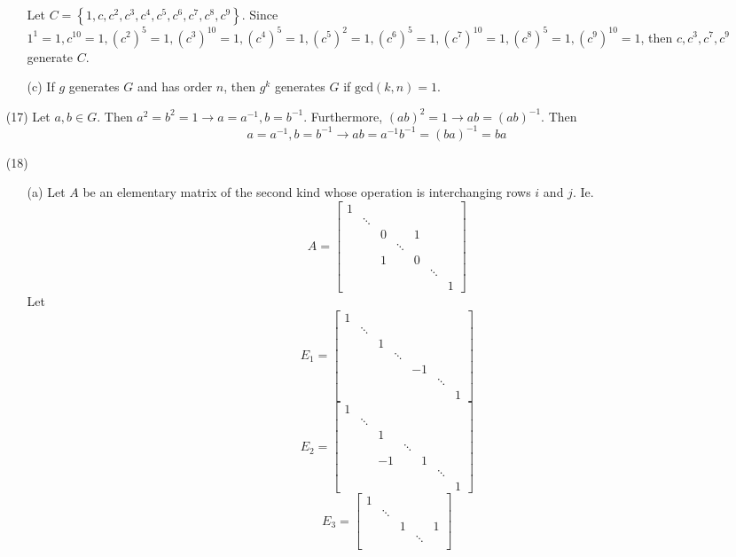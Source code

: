 \begin{itemize}
\begin{itemize}
Let $C = \left\lbrace 1, c, c^2, c^3, c^4, c^5, c^6, c^7, c^8, c^9 \right\rbrace$. Since $1^1 = 1, c^{10} = 1, (c^2)^5 = 1, (c^3)^{10} = 1, (c^4)^5 = 1, (c^5)^2 = 1, (c^6)^5 = 1, (c^7)^{10} = 1, (c^8)^5 = 1, (c^9)^{10} = 1$, then $c, c^3, c^7, c^9$ generate $C$.
\item[(c)] If $g$ generates $G$ and has order $n$, then $g^k$ generates $G$ if $\text{gcd}(k, n) = 1$.
\end{itemize}
\item[(17)]
Let $a, b \in G$. Then $a^2 = b^2 = 1 \rightarrow a = a^{-1}, b = b^{-1}$. Furthermore, $(ab)^2 = 1 \rightarrow ab = (ab)^{-1}$. Then
$$a = a^{-1}, b = b^{-1} \rightarrow ab = a^{-1}b^{-1} = (ba)^{-1} = ba$$
\item[(18)]
\begin{itemize}
\item[(a)]
Let $A$ be an elementary matrix of the second kind whose operation is interchanging rows $i$ and $j$. Ie.
$$A = \begin{bmatrix}
1 \\
& \ddots \\
& & 0 & & 1 \\
& & & \ddots \\
& & 1 & & 0 \\
& & & & & \ddots \\
& & & & & & 1
\end{bmatrix}$$
Let
$$E_1 = \begin{bmatrix}
1 \\
& \ddots \\
& & 1 \\
& & & \ddots \\
& & & & -1 \\
& & & & & \ddots \\
& & & & & & 1
\end{bmatrix}$$
$$E_2 = \begin{bmatrix}
1 \\
& \ddots \\
& & 1 \\
& & & \ddots \\
& & -1 & & 1 \\
& & & & & \ddots \\
& & & & & & 1
\end{bmatrix}$$
$$E_3 = \begin{bmatrix}
1 \\
& \ddots \\
& & 1 & & 1 \\
& & & \ddots \\

\end{bmatrix}$$
\end{itemize}
\end{itemize}
